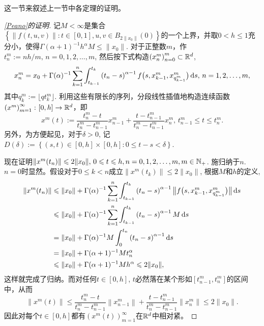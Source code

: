 这一节来叙述上一节中各定理的证明。
\begin{proof}[\cref{Peano}的证明]
    记$M<\infty$是集合$\left\{\left\|f(t,u,v)\right\|\colon t\in [0,1], u,v\in B_{2\|x_0\|}(0)\right\}$的一个上界，并取$0<h\leqslant 1$充分小，使得$\Gamma(\alpha + 1)^{-1} h^\alpha M \leqslant \|x_0\|$. 对于正整数$m$，作$t^m_{n}:=nh/m,\,n=0,1,2,\dots,m$, 然后按下式构造$\left(x^m_{n}\right)_{n=0}^m\subset \mathbb{R}^d$,
    \begin{equation}\label{PicardSequence}
        x^m_{n}=x_0+\Gamma(\alpha)^{-1}\sum_{k=1}^n\int_{t_{k-1}}^{t_k}\left(t_n-s\right)^{\alpha-1}f\bigl(s,x^m_{k-1},x^m_{q^m_{k-1}}\bigr)\mathop{}\!\mathrm{d} s,\,n=1,2,\dots,m,
    \end{equation}
    其中$q^m_{k}:=\lfloor qt^m_k \rfloor$. 利用这些有限长的序列，分段线性插值地构造连续函数$\left(x^m\right)_{m=1}^\infty\colon[0,h]\to \mathbb{R}^d$，即
    \begin{equation*}
        x^m(t):=\frac{t^m_n-t}{t^m_n-t^m_{n-1}}x^m_{n-1}+\frac{t-t^m_{n-1}}{t^m_n-t^m_{n-1}}x^m_{n},\,t^m_{n-1}\leqslant t\leqslant t^m_n.
    \end{equation*}
    另外，为方便起见，对于$\delta>0$, 记$D(\delta):=\left\{(s,t)\in [0,h]\times [0,h]\colon 0\leqslant t-s<\delta\right\}$.

    现在证明$\|x^m(t_n)\|\leqslant 2\|x_0\|,\,0\leqslant t\leqslant h,n=0,1,2,\dots,m,m\in \mathbb{N_+}$. 施归纳于$n$. $n=0$时显然。假设对于$0\leqslant k<n$成立$\|x^m(t_k)\|\leqslant 2\|x_0\|$, 根据$M$和$h$的定义,
    \begin{align*}
        \left\|x^m(t_n)\right\|&\leqslant \|x_0\|+\Gamma(\alpha)^{-1}\sum_{k=1}^{n}\int_{t_{k-1}}^{t_k} \left(t_n-s\right)^{\alpha-1} \bigl\|f\bigl(s,x^m_{k-1},x^m_{q^m_{k-1}}\bigr)\bigr\| \mathop{}\!\mathrm{d} s
        \\ &\leqslant \|x_0\|+\Gamma(\alpha)^{-1} \sum_{k=1}^{n}\int_{t_{k-1}}^{t_k} \left(t_n-s\right)^{\alpha-1} M \mathop{}\!\mathrm{d} s
        \\ &= \|x_0\|+\Gamma(\alpha)^{-1} M \int_{0}^{t_n} \left(t_n-s\right)^{\alpha-1} \mathop{}\!\mathrm{d} s
        \\ &= \|x_0\|+\Gamma(\alpha+1)^{-1} M t_n^\alpha
        \\ &\leqslant \|x_0\|+\Gamma(\alpha+1)^{-1} M h^\alpha
        \leqslant 2\|x_0\|,
    \end{align*}
    这样就完成了归纳。而对任何$t\in [0,h]$, $t$必然落在某个形如$\left[t^m_{n-1},t^m_n\right]$的区间中，从而
    \begin{equation*}
        \left\|x^m(t)\right\|\leqslant \frac{t^m_n-t}{t^m_n-t^m_{n-1}}\left\|x^m_{n-1}\right\|+\frac{t-t^m_{n-1}}{t^m_n-t^m_{n-1}}\left\|x^m_{n}\right\|\leqslant 2\|x_0\|.
    \end{equation*}
    因此对每个$t\in [0,h]$都有$\left(x^m(t)\right)_{m=1}^\infty$在$\mathbb{R}^d$中相对紧。


\end{proof}

